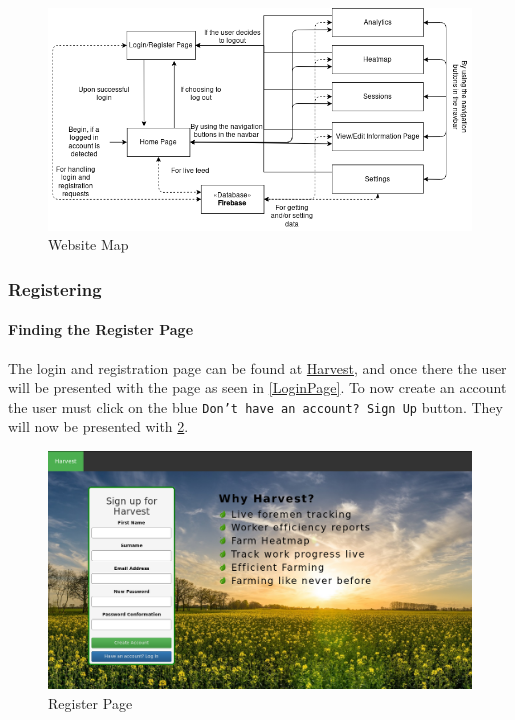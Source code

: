 \documentclass[11pt]{article}
\begin{document}
\begin{figure}[h]
 \centering
 \includegraphics[width=12cm, keepaspectratio]{Images/webDiagramMap.png}
 \caption{Website Map}
 \label{WebsiteMap}
\end{figure}

\subsubsection{Registering}
\paragraph{Finding the Register Page}The login and registration page can be found at \href{https://harvestapp.co.za}{Harvest}, and once there the user will be presented with the page as seen in \ref{LoginPage}. To now create an account the user must click on the blue \texttt{Don't have an account? Sign Up} button. They will now be presented with \ref{RegisterPage}.

\begin{figure}
 \centering
 \includegraphics[width=12cm, keepaspectratio]{Images/webRegister-Page.png}
 \caption{Register Page}
 \label{RegisterPage}
\end{figure}
\end{document}
